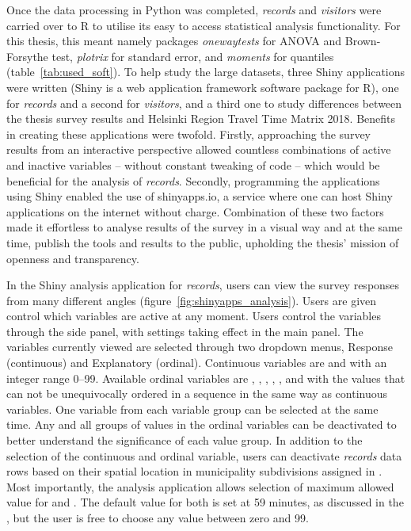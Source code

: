 Once the data processing in Python was completed, \textit{records} and \textit{visitors} were carried over to R to utilise its easy to access statistical analysis functionality. For this thesis, this meant namely packages \textit{onewaytests} for ANOVA and Brown-Forsythe test, \textit{plotrix} for standard error, and \textit{moments} for quantiles (table~\ref{tab:used_soft}). To help study the large datasets, three Shiny applications were written (Shiny is a web application framework software package for R), one for \textit{records} and a second for \textit{visitors}, and a third one to study differences between the thesis survey results and Helsinki Region Travel Time Matrix 2018. Benefits in creating these applications were twofold. Firstly, approaching the survey results from an interactive perspective allowed countless combinations of active and inactive variables -- without constant tweaking of code -- which would be beneficial for the analysis of \textit{records}. Secondly, programming the applications using Shiny enabled the use of shinyapps.io, a service where one can host Shiny applications on the internet without charge. Combination of these two factors made it effortless to analyse results of the survey in a visual way and at the same time, publish the tools and results to the public, upholding the thesis' mission of openness and transparency.

In the Shiny analysis application for \textit{records}, users can view the survey responses from many different angles (figure~\ref{fig:shinyapps_analysis}). Users are given control which variables are active at any moment. Users control the variables through the side panel, with settings taking effect in the main panel. The variables currently viewed are selected through two dropdown menus, Response (continuous) and Explanatory (ordinal). Continuous variables are  and  with an integer range 0--99. Available ordinal variables are , , , , , and  with the values that can not be unequivocally ordered in a sequence in the same way as continuous variables. One variable from each variable group can be selected at the same time. Any and all groups of values in the ordinal variables can be deactivated to better understand the significance of each value group. In addition to the selection of the continuous and ordinal variable, users can deactivate \textit{records} data rows based on their spatial location in municipality subdivisions assigned in \hyperref[sec:c3-processdata]{}. Most importantly, the analysis application allows selection of maximum allowed value for  and . The default value for both is set at 59 minutes, as discussed in the , but the user is free to choose any value between zero and 99.

